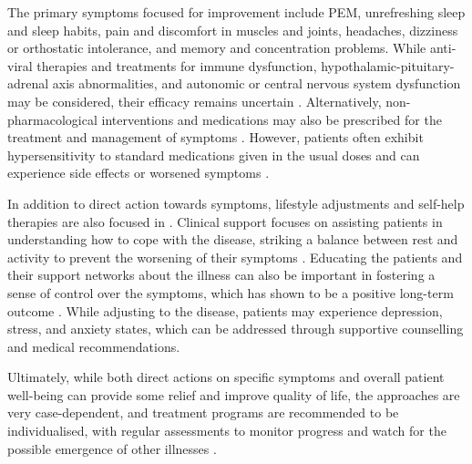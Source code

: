 The primary symptoms focused for improvement include PEM, unrefreshing sleep and sleep habits, pain and discomfort in muscles and joints, headaches, dizziness or orthostatic intolerance, and memory and concentration problems.
While anti-viral therapies and treatments for immune dysfunction, hypothalamic-pituitary-adrenal axis abnormalities, and autonomic or central nervous system dysfunction may be considered, their efficacy remains uncertain \citep{carruthers2003MyalgicEncephalomyelitis}.
Alternatively, non-pharmacological interventions and medications may also be prescribed for the treatment and management of symptoms \citep{rowe2017MyalgicEncephalomyelitis}.
However, \cfs patients often exhibit hypersensitivity to standard medications given in the usual doses and can experience side effects or worsened symptoms \citep{carruthers2003MyalgicEncephalomyelitis}.

In addition to direct action towards symptoms, lifestyle adjustments and self-help therapies are also focused in \cfs.
Clinical support focuses on assisting patients in understanding how to cope with the disease, striking a balance between rest and activity to prevent the worsening of their symptoms \citep{carruthers2003MyalgicEncephalomyelitis, rowe2017MyalgicEncephalomyelitis}.
Educating the patients and their support networks about the illness can also be important in fostering a sense of control over the symptoms, which has shown to be a positive long-term outcome \citep{cairns2005SystematicReview}.
While adjusting to the disease, patients may experience 
depression, stress, and anxiety states, which can be addressed through supportive counselling and medical recommendations.

Ultimately, while both direct actions on specific symptoms and overall patient well-being can provide some relief and improve quality of life, the approaches are very case-dependent, and treatment programs are recommended to be individualised, with regular assessments to monitor progress and watch for the possible emergence of other illnesses \citep{niceguideline2021OverviewMyalgic}.

